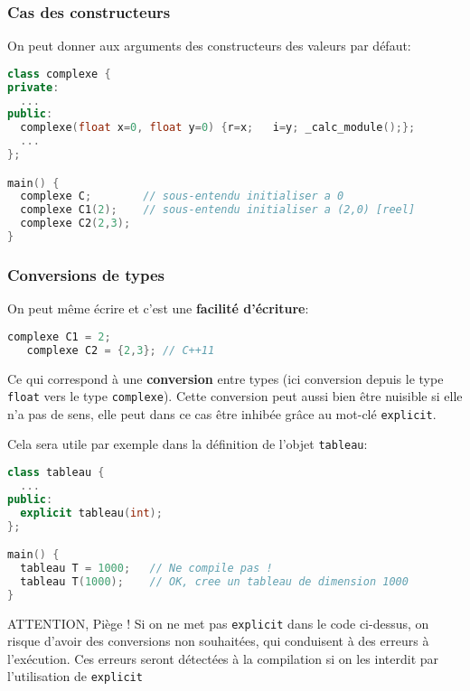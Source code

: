 \documentclass{beamer}
\begin{document}
\begin{frame}[fragile=singleslide,shrink=20]
\frametitle {Cas des constructeurs}
On peut donner aux arguments des constructeurs des valeurs par défaut:
\begin{lstlisting}[language=c++]
class complexe {
private:
  ...
public:
  complexe(float x=0, float y=0) {r=x;   i=y; _calc_module();};
  ...
};

main() {
  complexe C;        // sous-entendu initialiser a 0
  complexe C1(2);    // sous-entendu initialiser a (2,0) [reel]
  complexe C2(2,3);
}
\end{lstlisting}
\end{frame}

\begin{frame}[fragile=singleslide,shrink=20]
\frametitle {Conversions de types}

On peut même écrire et c'est une \textbf{facilité d'écriture}:
\begin{lstlisting}[language=c++]
   complexe C1 = 2;
   complexe C2 = {2,3}; // C++11
\end{lstlisting}

Ce qui correspond à une \textbf{conversion} entre types (ici conversion depuis le type \texttt{float} vers le type \texttt{complexe}). 
Cette conversion peut aussi bien être nuisible si elle n'a pas de sens, 
elle peut dans ce cas être inhibée grâce au mot-clé \texttt{explicit}. 

Cela sera utile par exemple dans la définition de l'objet \texttt{tableau}:

\begin{lstlisting}[language=c++]
class tableau {
  ...
public:
  explicit tableau(int);                                              
};

main() {
  tableau T = 1000;   // Ne compile pas !
  tableau T(1000);    // OK, cree un tableau de dimension 1000
}
\end{lstlisting}

\begin{block}{ATTENTION, Piège !}
Si on ne met pas \texttt{explicit} dans le code ci-dessus, on risque d'avoir des conversions non souhaitées, qui conduisent à des erreurs à l'exécution. 
Ces erreurs seront détectées à la compilation si on les interdit par l'utilisation de \texttt{explicit}
\end{block}
\end{frame}
\end{document}
